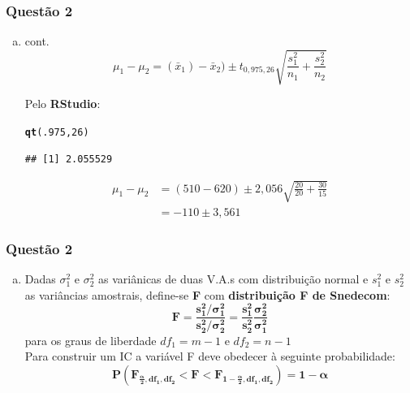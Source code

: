 \documentclass{beamer}\usepackage[]{graphicx}\usepackage[]{color}
\makeatletter
\newcommand{\hlnum}[1]{\textcolor[rgb]{0.686,0.059,0.569}{#1}}%
\newcommand{\hlstd}[1]{\textcolor[rgb]{0.345,0.345,0.345}{#1}}%
\newcommand{\hlkwd}[1]{\textcolor[rgb]{0.737,0.353,0.396}{\textbf{#1}}}%
\newenvironment{kframe}{%
 \def\at@end@of@kframe{}%
 \ifinner\ifhmode%
  \def\at@end@of@kframe{\end{minipage}}%
  \begin{minipage}{\columnwidth}%
 \fi\fi%
 \def\FrameCommand##1{\hskip\@totalleftmargin \hskip-\fboxsep
 \colorbox{shadecolor}{##1}\hskip-\fboxsep
     \hskip-\linewidth \hskip-\@totalleftmargin \hskip\columnwidth}%
 \MakeFramed {\advance\hsize-\width
   \@totalleftmargin\z@ \linewidth\hsize
   \@setminipage}}%
 {\par\unskip\endMakeFramed%
 \at@end@of@kframe}
\newenvironment{knitrout}{}{} %
\makeatother
\begin{document}
    	\begin{frame}[fragile]
    		\frametitle{Questão 2}
    		\begin{enumerate}[a)]
    			\item cont.$$\mu_{1} - \mu_{2} = (\bar{x}_1) - \bar{x}_2)\pm t_{0,975,26}\sqrt{\frac{s_{1}^{2}}{n_{1}}+\frac{s_{2}^{2}}{n_{2}}}$$
    			
    			Pelo \textbf{RStudio}:
\begin{knitrout}
\color{fgcolor}\begin{kframe}
\begin{alltt}
\hlkwd{qt}\hlstd{(}\hlnum{.975}\hlstd{,}\hlnum{26}\hlstd{)}
\end{alltt}
\begin{verbatim}
## [1] 2.055529
\end{verbatim}
\end{kframe}
\end{knitrout}
    		\begin{align*}
		        \mu_{1} - \mu_{2} &= (510 - 620) \pm 2,056\sqrt{\frac{20}{20} + \frac{30}{15}}\\
			&= -110 \pm 3,561
				\end{align*}
    		\end{enumerate}
    	\end{frame}
    	
    	\begin{frame}
    		\frametitle{Questão 2}
    		\begin{enumerate}[b)]
    			\item Dadas $\sigma_{1}^{2}$ e $\sigma_{2}^{2}$ as variânicas de duas V.A.s com distribuição normal e $s_{1}^2$ e $s_{2}^{2}$ as variâncias amostrais, define-se \textbf{F} com \textbf{distribuição F de Snedecom}:
    		$$\boldsymbol{F = \frac{s^{2}_{1}/\sigma_{1}^{2}}{s^{2}_{2}/\sigma_{2}^{2}} = \frac{s^{2}_{1}}{s^{2}_{2}} \frac{\sigma_{2}^{2}}{\sigma_{1}^{2}}}$$ 
    			para os graus de liberdade $df_{1} = m-1$ e $df_{2} = n-1$\\
    			Para construir um IC a variável F deve obedecer à seguinte probabilidade:
    			$$\boldsymbol{P(F_{\frac{\alpha}{2},df_{1},df_{2}} < F < F_{1-\frac{\alpha}{2},df_{1},df_{2}}) = 1 - \alpha}$$
    		\end{enumerate}	
    	\end{frame}
    
\end{document}
